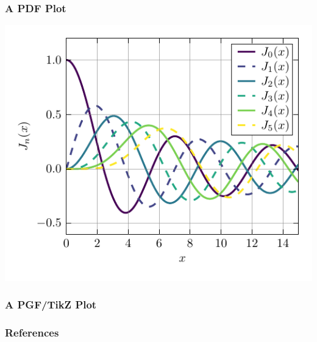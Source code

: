 \documentclass[pdf,smaller,aspectratio=169]{beamer}
\begin{document}
\begin{frame}
  \frametitle{A PDF Plot}
  \begin{center}
    \includegraphics{./plots/bessel.pdf}
  \end{center}
\end{frame}

\begin{frame}
  \frametitle{A PGF/TikZ Plot}
  \begin{center}
    
  \end{center}
\end{frame}

\sectionimage{}
\begin{frame}[allowframebreaks]
  \frametitle{References}
  \renewcommand*{\bibfont}{\scriptsize}
  \printbibliography
\end{frame}
\end{document}

